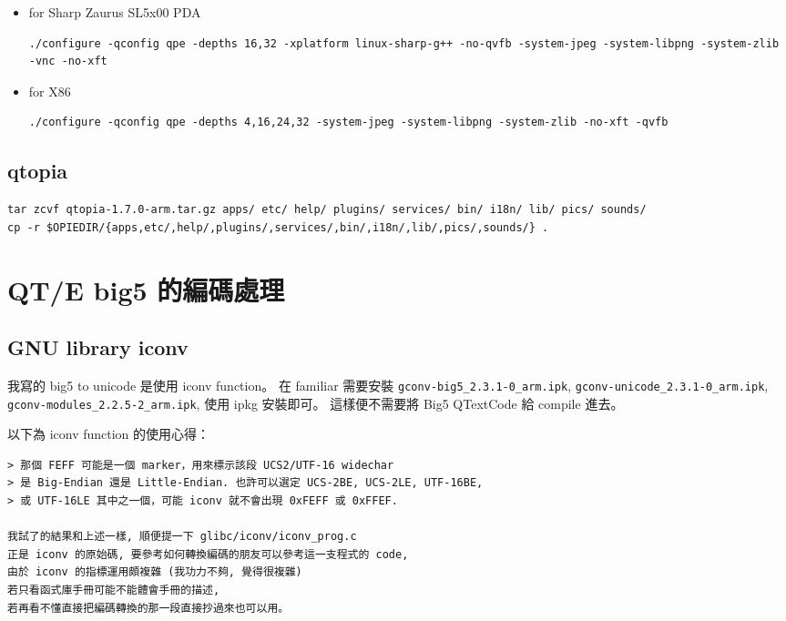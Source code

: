 \documentclass[12pt,a4paper]{article}
\begin{document}
\begin{CJK}{UTF8}{bsmi}
\begin{itemize}
\item for Sharp Zaurus SL5x00 PDA

\begin{verbatim}
./configure -qconfig qpe -depths 16,32 -xplatform linux-sharp-g++ -no-qvfb -system-jpeg -system-libpng -system-zlib -vnc -no-xft
\end{verbatim}

\item for X86
\begin{verbatim}
./configure -qconfig qpe -depths 4,16,24,32 -system-jpeg -system-libpng -system-zlib -no-xft -qvfb
\end{verbatim}

\end{itemize}

\subsection{qtopia}
\begin{verbatim}
tar zcvf qtopia-1.7.0-arm.tar.gz apps/ etc/ help/ plugins/ services/ bin/ i18n/ lib/ pics/ sounds/
cp -r $OPIEDIR/{apps,etc/,help/,plugins/,services/,bin/,i18n/,lib/,pics/,sounds/} .
\end{verbatim}

\section{QT/E big5 的編碼處理}
\subsection{GNU library iconv}
我寫的 big5 to unicode 是使用 iconv function。
在 familiar 需要安裝 \verb+gconv-big5_2.3.1-0_arm.ipk+, \verb+gconv-unicode_2.3.1-0_arm.ipk+, \verb+gconv-modules_2.2.5-2_arm.ipk+, 使用 ipkg 安裝即可。
這樣便不需要將 Big5 QTextCode 給 compile 進去。

以下為 iconv function 的使用心得：
\begin{verbatim}
> 那個 FEFF 可能是一個 marker，用來標示該段 UCS2/UTF-16 widechar 
> 是 Big-Endian 還是 Little-Endian. 也許可以選定 UCS-2BE, UCS-2LE, UTF-16BE,
> 或 UTF-16LE 其中之一個，可能 iconv 就不會出現 0xFEFF 或 0xFFEF.

我試了的結果和上述一樣, 順便提一下 glibc/iconv/iconv_prog.c
正是 iconv 的原始碼, 要參考如何轉換編碼的朋友可以參考這一支程式的 code,
由於 iconv 的指標運用頗複雜 (我功力不夠, 覺得很複雜) 
若只看函式庫手冊可能不能體會手冊的描述,
若再看不懂直接把編碼轉換的那一段直接抄過來也可以用。
\end{verbatim}


\end{CJK}
\end{document}
